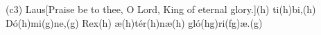 (c3) Laus[Praise be to thee, O Lord, King of eternal glory.](h) ti(h)bi,(h) Dó(h)mi(g)ne,(g) Rex(h) æ(h)tér(h)næ(h) gló(hg)ri(fg)æ.(g)